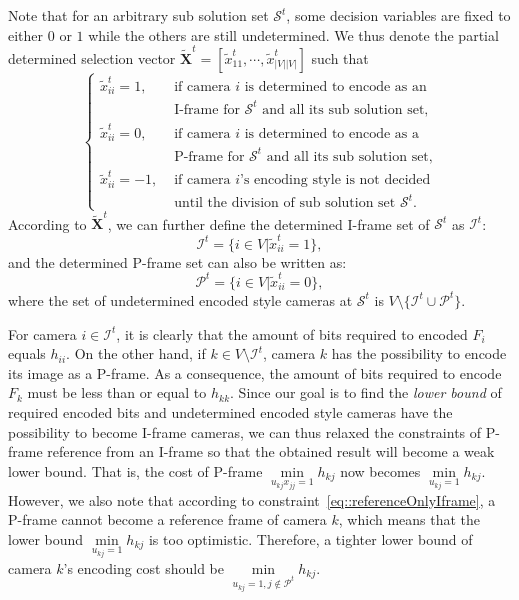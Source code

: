 Note that for an arbitrary sub solution set $\mathcal{S}^t$, some decision variables are fixed to either $0$ or $1$ while the others are still undetermined.
We thus denote the partial determined selection vector ${\tilde{\mathbf{X}}^t = \left[ \tilde{x}_{11}^t,\cdots, \tilde{x}_{|V||V|}^t \right] }$ such that
\begin{equation*}
\left\{ \begin{array}{ll}
\tilde{x}_{ii}^t = 1,  &\text{ if camera $i$ is determined to encode as an} \\
                   	   &\text{ I-frame for $\mathcal{S}^t$ and all its sub solution set,} \\
\tilde{x}_{ii}^t = 0,  &\text{ if camera $i$ is determined to encode as a} \\
                   	   &\text{ P-frame for $\mathcal{S}^t$ and all its sub solution set,} \\
\tilde{x}_{ii}^t = -1, &\text{ if camera $i$'s encoding style is not decided} \\
                       &\text{ until the division of sub solution set $\mathcal{S}^t$.}
\end{array} \right.
\end{equation*}
%
According to $\tilde{\mathbf{X}}^t$, we can further define the determined I-frame set of $\mathcal{S}^t$ as $\mathcal{I}^t$:
\begin{equation}
\mathcal{I}^t = \{ i \in V | \tilde{x}_{ii}^t = 1 \},
\label{eq::IframeSet}
\end{equation}
and the determined P-frame set can also be written as:
\begin{equation}
\mathcal{P}^t = \{ i \in V | \tilde{x}_{ii}^t = 0 \},
\label{eq::PframeSet}
\end{equation}
where the set of undetermined encoded style cameras at $\mathcal{S}^t$ is $V \setminus \{ \mathcal{I}^t \cup \mathcal{P}^t \}$.

For camera $i \in \mathcal{I}^t$, it is clearly that the amount of bits required to encoded $F_i$ equals $h_{ii}$.
On the other hand, if $k \in V \setminus \mathcal{I}^t$, camera $k$ has the possibility to encode its image as a P-frame.
As a consequence, the amount of bits required to encode $F_k$ must be less than or equal to $h_{kk}$.
Since our goal is to find the \emph{lower bound} of required encoded bits and undetermined encoded style cameras have the possibility to become I-frame cameras, we can thus relaxed the constraints of P-frame reference from an I-frame so that the obtained result will become a weak lower bound.
That is, the cost of P-frame $\underset{u_{kj}x_{jj}=1}{\min} h_{kj}$ now becomes $\underset{u_{kj}=1}{\min} h_{kj}$.
However, we also note that according to constraint~\eqref{eq::referenceOnlyIframe}, a P-frame cannot become a reference frame of camera $k$, which means that the lower bound $\underset{u_{kj}=1}{\min} h_{kj}$ is too optimistic.
Therefore, a tighter lower bound of camera $k$'s encoding cost should be $\underset{u_{kj}=1, j \notin \mathcal{P}^t}{\min} h_{kj}$.
%


